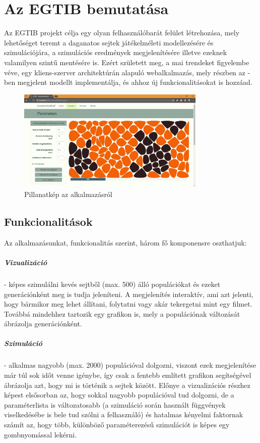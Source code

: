 \newcommand{\projectName}{Az EGTIB}

\chapter{\projectName{} bemutatása}

\projectName{} projekt célja egy olyan felhasználóbarát felület létrehozása, mely lehetőséget teremt a daganatos sejtek játékelméleti modellezésére és szimulációjára, a szimulációs eredmények megjelenítésére illetve ezeknek valamilyen szintű mentésére is. Ezért született meg, a mai trendeket figyelembe véve, egy kliens-szerver architektúrán alapuló webalkalmazás, mely részben az \cite{archetti2016cooperation}-ben megjelent modellt implementálja, és ahhoz új funkcionalitásokat is hozzáad.

\begin{figure}[ht!]
	\centering
	\includegraphics[width=90mm]{images/EGTIB.jpg}
	\caption{Pillanatkép az alkalmazásról \label{fig:SimulateWithDiagram}}
\end{figure}

\section{Funkcionalitások}

Az alkalmazásunkat, funkcionalitás szerint, három fő komponensre oszthatjuk:

\paragraph{Vizualizáció}- képes szimulálni kevés sejtből (max. 500) álló populációkat és ezeket generációnként meg is tudja jeleníteni. A megjelenítés interaktív, ami azt jelenti, hogy bármikor meg lehet állítani, folytatni vagy akár tekergetni mint egy filmet. Továbbá mindehhez tartozik egy grafikon is, mely a populációnak változását ábrázolja generációnként.

\paragraph{Szimuláció}- alkalmas nagyobb (max. 2000) populációval dolgozni, viszont ezek megjelenítése már túl sok időt venne igénybe, így csak a fentebb említett grafikon segítségével ábrázolja azt, hogy mi is történik a sejtek között. Előnye a vizualizációs részhez képest elsősorban az, hogy sokkal nagyobb populációval tud dolgozni, de a paraméterlista is változatosabb (a szimuláció során használt függvények viselkedésébe is bele tud szólni a felhasználó) és hatalmas kényelmi faktornak számít az, hogy több, különböző paraméterezésű szimulációt is képes egy gombnyomással lekérni.

